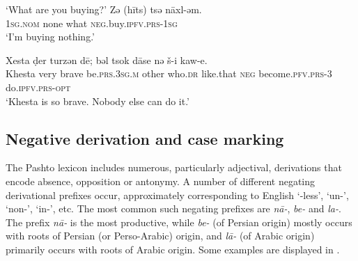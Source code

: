 \documentclass[output=paper,colorlinks,citecolor=brown]{langscibook}
\begin{document}
\ea\label{ex:pas:43}
    \begin{xlist}[Q: ]
    \label{ex:pas:42Q}
        \glt ‘What are you buying?’
    \label{ex:pas:42A}
        \gll  Zə (h\={i}ts) tsə n\={a}xl{}-əm.\\ 
              \textsc{1sg.nom} none what \textsc{neg.}buy.\textsc{ipfv.prs-1sg}\\
        \glt ‘I’m buying nothing.’
    \end{xlist}
\z 

\ea\label{ex:pas:44} 
    \gll  Xesta ḍer turzən dē; bəl tsok dāse nə š{}-i kaw-e.\\ 
        Khesta very brave be.\textsc{prs.3sg.m} other who.\textsc{dr}
        like.that \textsc{neg} become.\textsc{pfv.prs{}-3} do\textsc{.ipfv.prs-opt}\\
    \glt ‘Khesta is so brave. Nobody else can do it.’
\z 

\subsection{Negative derivation and case marking}\label{sec:pas:3.3}

The Pashto lexicon includes numerous, particularly adjectival, derivations that encode absence, opposition or antonymy. A number of different negating derivational prefixes occur, approximately corresponding to English ‘\nobreakdash-less’, ‘un\nobreakdash-’, ‘non\nobreakdash-’, ‘in\nobreakdash-’, etc. The most common such negating prefixes are \textit{n\={a}-}, \textit{be-} and \textit{la-}. The prefix \textit{n\={a}-} is the most productive, while \textit{be-} (of Persian origin) mostly occurs with roots of Persian (or Perso-Arabic) origin, and \textit{l\={a}-} (of Arabic origin) primarily occurs with roots of Arabic origin. Some examples are displayed in .
\end{document}
